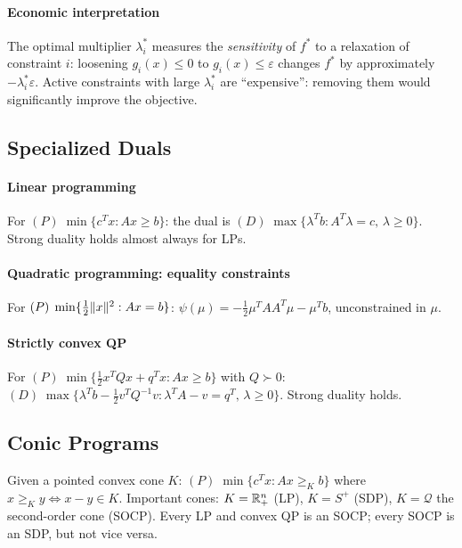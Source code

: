 \paragraph{Economic interpretation}

The optimal multiplier $\lambda_i^*$ measures the \emph{sensitivity} of $f^*$ to a relaxation of constraint $i$: loosening $g_i(x) \leq 0$ to $g_i(x) \leq \varepsilon$ changes $f^*$ by approximately $-\lambda_i^* \varepsilon$.
Active constraints with large $\lambda_i^*$ are ``expensive'': removing them would significantly improve the objective.


\subsection{Specialized Duals}\label{sec:specialized-duals}

\paragraph{Linear programming}

For $(P)\; \min\{c^T x : Ax \geq b\}$: the dual is $(D)\; \max\{\lambda^T b : A^T\lambda = c,\, \lambda \geq 0\}$.
Strong duality holds almost always for LPs.

\paragraph{Quadratic programming: equality constraints}

For $(P)\; \min\{\frac{1}{2}\lVert x\rVert^2 : Ax = b\}$: $\psi(\mu) = -\frac{1}{2}\mu^T AA^T\mu - \mu^T b$, unconstrained in $\mu$.

\paragraph{Strictly convex QP}

For $(P)\; \min\{\frac{1}{2}x^T Qx + q^T x : Ax \geq b\}$ with $Q \succ 0$:
$(D)\; \max\{\lambda^T b - \frac{1}{2}v^T Q^{-1}v : \lambda^T A - v = q^T,\, \lambda \geq 0\}$.
Strong duality holds.


\subsection{Conic Programs}\label{sec:conic}

\begin{definition}\label{def:conic}
	Given a pointed convex cone $K$:
	$(P)\; \min\{c^T x : Ax \geq_K b\}$ where $x \geq_K y \Leftrightarrow x - y \in K$.
	Important cones: $K = \mathbb{R}_+^n$ (LP), $K = S^+$ (SDP), $K = \mathcal{Q}$ the second-order cone (SOCP).
	Every LP and convex QP is an SOCP; every SOCP is an SDP, but not vice versa.
\end{definition}

